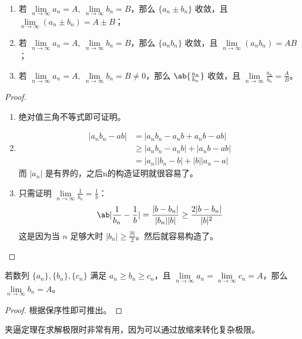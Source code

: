 \begin{theorem}[极限的四则运算]
	\ 
	\begin{enumerate}
		\item 若 $\lim\limits_{n \to \infty} a_n = A,\ \lim\limits_{n \to \infty} b_n = B$，那么 $\{a_n \pm b_n\}$ 收敛，且 $\lim\limits_{n \to \infty} (a_n \pm b_n) = A \pm B$；
		\item 若 $\lim\limits_{n \to \infty} a_n = A,\ \lim\limits_{n \to \infty} b_n = B$，那么 $\{a_n b_n\}$ 收敛，且 $\lim\limits_{n \to \infty} (a_n b_n) = A B$；
		\item 若 $\lim\limits_{n \to \infty} a_n = A,\ \lim\limits_{n \to \infty} b_n = B \neq 0$，那么 $\ab\{\frac{a_n}{b_n}\}$ 收敛，且 $\lim\limits_{n \to \infty} \frac{a_n}{b_n} = \frac{A}{B}$。
	\end{enumerate}

	\begin{proof}
		\begin{enumerate}
			\item 绝对值三角不等式即可证明。
			\item
			$$
			\begin{aligned}
				|a_n b_n - a b| & = |a_n b_n - a_n b + a_n b - a b| \\
				& \ge |a_n b_n - a_n b| + |a_n b - a b| \\
				& = |a_n| |b_n - b| + |b| |a_n - a|
			\end{aligned}
			$$
			而 $|a_n|$ 是有界的，之后n的构造证明就很容易了。
			
			\item 只需证明 $\lim\limits_{n \to \infty} \frac{1}{b_n} = \frac{1}{b}$：
			$$
			\ab|\frac{1}{b_n} - \frac{1}{b}| = \frac{|b - b_n|}{|b_n| |b|} \ge \frac{2 |b - b_n|}{|b|^2}
			$$
			这是因为当 $n$ 足够大时 $|b_n| \ge \frac{|b|}{2}$。然后就容易构造了。
		\end{enumerate}
	\end{proof}
\end{theorem}

\begin{theorem}[夹逼定理]
	若数列 $\{a_n\},\{b_n\},\{c_n\}$ 满足 $a_n \ge b_n \ge c_n$，且 $\lim\limits_{n \to \infty} a_n = \lim\limits_{n \to \infty} c_n = A$，那么 $\lim\limits_{n \to \infty} b_n = A$。

	\begin{proof}
		根据保序性即可推出。
	\end{proof}
\end{theorem}

夹逼定理在求解极限时非常有用，因为可以通过放缩来转化复杂极限。


